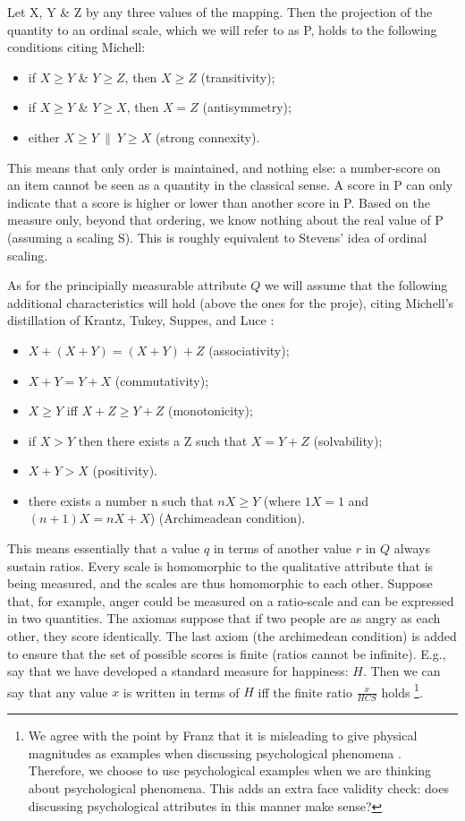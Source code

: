 \documentclass[utf8]{FrontiersinVancouver}
\begin{document}
Let X, Y \& Z by any three values of the mapping. Then the projection of the quantity to an ordinal scale, which we will refer to as P, holds to the following conditions citing Michell:
\begin{itemize}
    \item if $X \geq Y$ \& $Y \geq Z$, then $X \geq Z$ (transitivity);
    \item if $X \geq Y$ \& $Y \geq X$, then $X = Z$ (antisymmetry);
    \item either $X \geq Y\ \|\ Y \geq X$ (strong connexity).
\end{itemize}

This means that only order is maintained, and nothing else: a number-score on an item cannot be seen as a quantity in the classical sense. A score in P can only indicate that a score is higher or lower than another score in P. Based on the measure only, beyond that ordering, we know nothing about the real value of P (assuming a scaling S). This is roughly equivalent to Stevens' idea of ordinal scaling.

As for the principially measurable attribute $Q$ we will assume that the following additional characteristics will hold (above the ones for the proje), citing Michell's distillation of Krantz, Tukey, Suppes, and Luce \citep{krantzFoundationsMeasurement1971}:

\begin{itemize}
    \item $X + (X + Y) = (X + Y) + Z$ (associativity);
    \item $X + Y = Y + X$ (commutativity);
    \item $X \geq Y$ iff $X + Z \geq Y + Z$ (monotonicity);
    \item if $X > Y$ then there exists a Z such that $X = Y + Z$ (solvability);
    \item $X + Y > X$ (positivity).
    \item there exists a number n such that $nX \geq Y$ (where $1X = 1$ and $(n + 1) X = nX + X$) (Archimeadean condition).
\end{itemize}

This means essentially that a value $q$ in terms of another value $r$ in $Q$ always sustain ratios. Every scale is homomorphic to the qualitative attribute that is being measured, and the scales are thus homomorphic to each other. Suppose that, for example, anger could be measured on a ratio-scale and can be expressed in two quantities. The axiomas suppose that if two people are as angry as each other, they score identically. The last axiom (the archimedean condition) is added to ensure that the set of possible scores is finite (ratios cannot be infinite). E.g., say that we have developed a standard measure for happiness: $H$. Then we can say that any value $x$ is written in terms of $H$ iff the finite ratio $\frac{x}{HCS}$ holds \footnote{We agree with the point by Franz that it is misleading to give physical magnitudes as examples when discussing psychological phenomena \citep{franzArePsychologicalAttributes2022}. Therefore, we choose to use psychological examples when we are thinking about psychological phenomena. This adds an extra face validity check: does discussing psychological attributes in this manner make sense?}.
\end{document}
